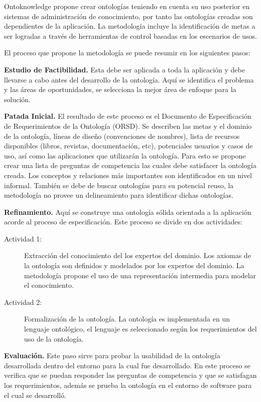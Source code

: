 Ontoknowledge\cite{On-to-knowledge} propone crear ontologías teniendo en cuenta su uso posterior en sistemas de administración de conocimiento, por tanto las ontologías creadas son dependientes de la aplicación. La metodología incluye la identificación de metas a ser logradas a través de herramientas de control basadas en los escenarios de usos.

El proceso que propone la metodología se puede resumir en los siguientes pasos:

\textbf{Estudio de Factibilidad.} Esta debe ser aplicada a toda la aplicación y debe llevarse a cabo antes del desarrollo de la ontología. Aquí se identifica el problema y las áreas de oportunidades, se selecciona la mejor área de enfoque para la solución.

\textbf{Patada Inicial.} El resultado de este proceso es el Documento de Especificación de Requerimientos de la Ontología (ORSD). Se describen las metas y el dominio de la ontología, líneas de diseño (convenciones de nombres), lista de recursos disponibles (libros, revistas, documentación, etc), potenciales usuarios y casos de uso, así como las aplicaciones que utilizarán la ontología. Para esto se propone crear una lista de preguntas de competencia las cuales debe satisfacer la ontología creada. Los conceptos y relaciones más importantes son identificados en un nivel informal. También se debe de buscar ontologías para su potencial reuso, la metodología no provee un delineamiento para identificar dichas ontologías.

\textbf{Refinamiento.} Aquí se construye una ontología sólida orientada a la aplicación acorde al proceso de especificación. Este proceso se divide en dos actividades:

\begin{description}
\item[Actividad 1:] Extracción del conocimiento del los expertos del dominio. Los axiomas de la ontología son definidos y modelados por los expertos del dominio. La metodología propone el uso de una representación intermedia para modelar el conocimiento.
\item[Actividad 2:] Formalización de la ontología. La ontología es implementada en un lenguaje ontológico, el lenguaje es seleccionado según los requerimientos del uso de la ontología.
\end{description}

\textbf{Evaluación.} Este paso sirve para probar la usabilidad de la ontología desarrollada dentro del entorno para la cual fue desarrollado. En este proceso se verifica que se puedan responder las preguntas de competencia y que se satisfagan los requerimientos, además se prueba la ontología en el entorno de software para el cual se desarrolló.

